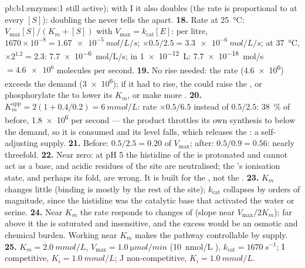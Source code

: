 \begin{solution}{pb:b1:enzymes:1}
still active); with I it also doubles (the rate is proportional to
 at every $[S]$): doubling the  never tells the 
apart.
\textbf{18.} Rate at \qty{25}{\celsius}: $V_{\max}[S]/(K_m + [S])$ with
$V_{\max} = k_{\text{cat}}[E]$: per litre, $1670\times 10^{-8} =
\qty{1.67e-5}{mol/L/s}$; $\times 0.5/2.5 = \qty{3.3e-6}{mol/L/s}$; at
\qty{37}{\celsius}, $\times 2^{1.2} = 2.3$: \qty{7.7e-6}{mol/L/s}; in
\qty{1e-12}{L}: \qty{7.7e-18}{mol/s} $= \num{4.6e6}$ molecules per
second.
\textbf{19.} No rise needed: the rate (\num{4.6e6}) exceeds the demand
(\num{3e6}); if it had to rise, the  could raise the , or
phosphorylate the  to lower its $K_m$, or make more .
\textbf{20.} $K_m^{\text{app}} = 2(1 + 0.4/0.2) = \qty{6}{mmol/L}$: rate
$\times 0.5/6.5$ instead of $0.5/2.5$: \qty{38}{\%} of before,
\num{1.8e6} per second --- the product throttles its own synthesis to
below the demand, so it is consumed and its level falls, which releases
the : a self-adjusting supply.
\textbf{21.} Before: $0.5/2.5 = 0.20$ of $V_{\max}$; after: $0.5/0.9 =
0.56$: nearly threefold.
\textbf{22.} Near zero: at pH 5 the histidine of the  is
protonated and cannot act as a base, and acidic residues of the site
are neutralised; the 's ionisation state, and perhaps its fold,
are wrong. It is built for the , not the .
\textbf{23.} $K_m$ changes little (binding is mostly by the rest of the
site); $k_{\text{cat}}$ collapses by orders of magnitude, since the
histidine was the catalytic base that activated the water or serine.
\textbf{24.} Near $K_m$ the rate responds to changes of 
(slope near $V_{\max}/2K_m$); far above it the  is saturated and
insensitive, and the excess  would be an osmotic and
chemical burden. Working near $K_m$ makes the pathway controllable by
supply.
\textbf{25.} $K_m = \qty{2.0}{mmol/L}$, $V_{\max} = \qty{1.0}{\micro mol/min}$
(\qty{10}{nmol/L} ), $k_{\text{cat}} = \qty{1670}{s^{-1}}$; I
competitive, $K_i = \qty{1.0}{mmol/L}$; J non-competitive, $K_i =
\qty{1.0}{mmol/L}$.
\end{solution}
